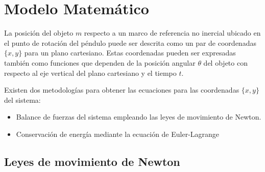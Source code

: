 \section{Modelo Matemático}


La posición del objeto $m$ respecto a un marco de referencia no inercial
ubicado en el punto de rotación del péndulo puede ser descrita como un par
de coordenadas $\{x, y\}$ para un plano cartesiano. Estas coordenadas pueden
ser expresadas también como funciones que dependen de la posición angular 
$\theta$ del objeto con respecto al eje vertical del plano cartesiano y el
tiempo $t$.

Existen dos metodologías para obtener las ecuaciones para las coordenadas 
$\{x, y\}$ del sistema:
\begin{itemize}
 \item Balance de fuerzas del sistema empleando las leyes de 
 movimiento de Newton.
 \item Conservación de energía mediante la ecuación de Euler-Lagrange
\end{itemize}




\subsection{Leyes de movimiento de Newton}


% 
% 

